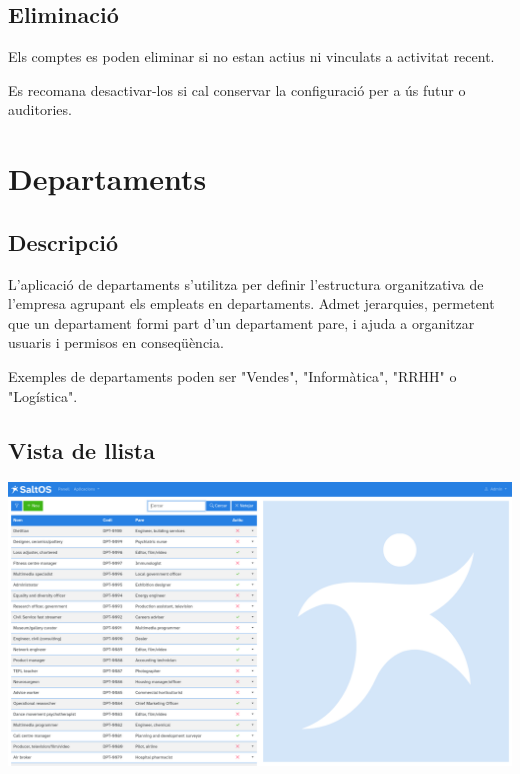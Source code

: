 \documentclass[a4paper]{article}
\begin{document}
\hypertarget{toc100}{}
\subsection{Eliminació}

Els comptes es poden eliminar si no estan actius ni vinculats a activitat recent.

Es recomana desactivar-los si cal conservar la configuració per a ús futur o auditories.


\hypertarget{toc101}{}
\section{Departaments}

\hypertarget{toc102}{}
\subsection{Descripció}

L'aplicació de departaments s'utilitza per definir l'estructura organitzativa de l'empresa agrupant els empleats en departaments.
Admet jerarquies, permetent que un departament formi part d'un departament pare, i ajuda a organitzar usuaris i permisos en conseqüència.

Exemples de departaments poden ser "Vendes", "Informàtica", "RRHH" o "Logística".

\hypertarget{toc103}{}
\subsection{Vista de llista}

\begin{center}\includegraphics[width=1\textwidth]{../ujest/snaps/test-screenshots-js-screenshots-hr-departments-list-ca-es-1-snap.png}\end{center}
\end{document}
